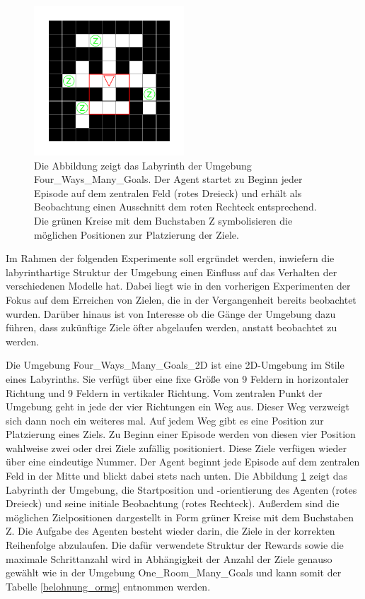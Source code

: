 \begin{figure}[ht!]
  \centering
  \includegraphics[keepaspectratio,width=0.5\textwidth]{abbildungen/fwmg.pdf}
  \caption{Die Abbildung zeigt das Labyrinth der Umgebung \glqq Four\_Ways\_Many\_Goals\grqq{}. Der Agent startet zu Beginn jeder Episode auf dem zentralen Feld (rotes Dreieck) und erhält als Beobachtung einen Ausschnitt dem roten Rechteck entsprechend. Die grünen Kreise mit dem Buchstaben Z symbolisieren die möglichen Positionen zur Platzierung der Ziele.}
  \label{fig_fwmg_ep_start}
\end{figure}


Im Rahmen der folgenden Experimente soll ergründet werden, inwiefern die labyrinthartige Struktur der Umgebung einen Einfluss auf das Verhalten der verschiedenen Modelle hat. Dabei liegt wie in den vorherigen Experimenten der Fokus auf dem Erreichen von Zielen, die in der Vergangenheit bereits beobachtet wurden. Darüber hinaus ist von Interesse ob die Gänge der Umgebung dazu führen, dass zukünftige Ziele öfter abgelaufen werden, anstatt beobachtet zu werden.

Die Umgebung \glqq Four\_Ways\_Many\_Goals\_2D \grqq{} ist eine 2D-Umgebung im Stile eines Labyrinths. Sie verfügt über eine fixe Größe von 9 Feldern in horizontaler Richtung und 9 Feldern in vertikaler Richtung. Vom zentralen Punkt der Umgebung geht in jede der vier Richtungen ein Weg aus. Dieser Weg verzweigt sich dann noch ein weiteres mal. Auf jedem Weg gibt es eine Position zur Platzierung eines Ziels. Zu Beginn einer Episode werden von diesen vier Position wahlweise zwei oder drei Ziele zufällig positioniert. Diese Ziele verfügen wieder über eine eindeutige Nummer. Der Agent beginnt jede Episode auf dem zentralen Feld in der Mitte und blickt dabei stets nach unten. Die Abbildung \ref{fig_fwmg_ep_start} zeigt das Labyrinth der Umgebung, die Startposition und -orientierung des Agenten (rotes Dreieck) und seine initiale Beobachtung (rotes Rechteck). Außerdem sind die möglichen Zielpositionen dargestellt in Form grüner Kreise mit dem Buchstaben Z. Die Aufgabe des Agenten besteht wieder darin, die Ziele in der korrekten Reihenfolge abzulaufen. Die dafür verwendete Struktur der Rewards sowie die maximale Schrittanzahl wird in Abhängigkeit der Anzahl der Ziele genauso gewählt wie in der Umgebung \glqq One\_Room\_Many\_Goals\grqq{} und kann somit der Tabelle \ref{belohnung_ormg} entnommen werden.

